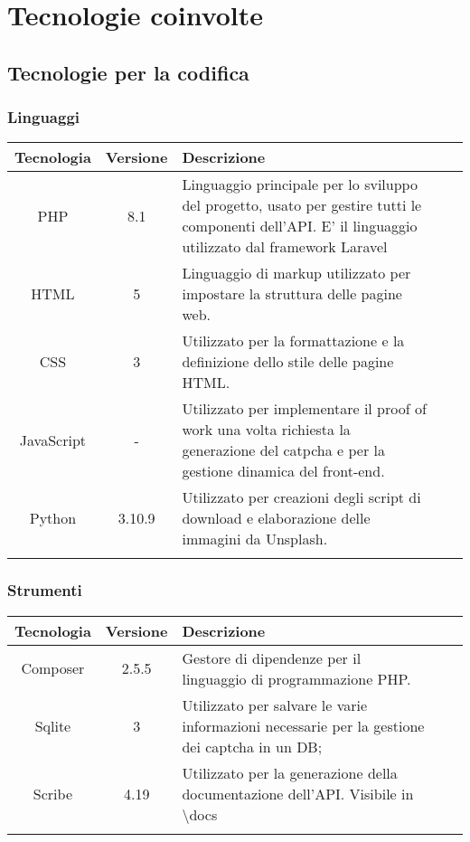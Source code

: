 \section{Tecnologie coinvolte}

\subsection{Tecnologie per la codifica}

\subsubsection{Linguaggi}

\begin{center}
\setlength\extrarowheight{5pt}
\renewcommand\tabularxcolumn[1]{>{\Centering}m{#1}}
\begin{tabularx}{\textwidth}{| c | c | X | X | X |} 
	\hline
	\rowcolor{white}
	\textbf{Tecnologia} & \textbf{Versione} & \textbf{Descrizione}\\
	\hline
	PHP & 8.1 & Linguaggio principale per lo sviluppo del progetto, usato per gestire tutti le componenti dell'API. E' il linguaggio utilizzato dal framework Laravel\\
	\hline
	HTML & 5 & Linguaggio di markup utilizzato per impostare la struttura delle pagine web.\\
	\hline
	CSS & 3 & Utilizzato per la formattazione e la definizione dello stile delle pagine HTML.\\
	\hline
	JavaScript & - & Utilizzato per implementare il proof of work una volta richiesta la generazione del catpcha e per la gestione dinamica del front-end.\\
	\hline
	Python & 3.10.9 & Utilizzato per creazioni degli script di download e elaborazione delle immagini da Unsplash.\\
	\hline
	\rowcolor{white}
	\caption{Linguaggi utilizzati}
\end{tabularx}
\end{center}

\subsubsection{Strumenti}

\begin{center}
\setlength\extrarowheight{5pt}
\renewcommand\tabularxcolumn[1]{>{\Centering}m{#1}}
\begin{tabularx}{\textwidth}{| c | c | X | X | X |} 
	\hline
	\rowcolor{white}
	\textbf{Tecnologia} & \textbf{Versione} & \textbf{Descrizione}\\
	\hline
	Composer & 2.5.5 &  Gestore di dipendenze per il linguaggio di programmazione PHP.\\
	\hline
	Sqlite & 3 & Utilizzato per salvare le varie informazioni necessarie per la gestione dei captcha in un DB;\\
	\hline
	Scribe & 4.19 & Utilizzato per la generazione della documentazione dell'API. Visibile in \textbackslash docs\\
	\rowcolor{white}
	\caption{Strumenti utilizzati}
\end{tabularx}
\end{center}
\newpage
